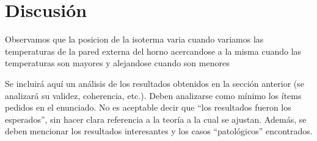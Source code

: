 \section{Discusión}


	Observamos que la posicion de la isoterma varia cuando variamos las temperaturas de la pared externa del horno acercandose a la misma cuando las temperaturas son mayores y alejandose cuando son menores




  {\color{Gray} Se incluirá aquí un análisis de los resultados obtenidos en la sección anterior (se analizará su validez, coherencia, etc.). Deben analizarse como mínimo los ítems pedidos en el enunciado. No es aceptable decir que ``los resultados fueron los esperados'', sin hacer clara referencia a la teoría a la cual se ajustan. Además, se deben mencionar los resultados interesantes y los casos ``patológicos'' encontrados.}
